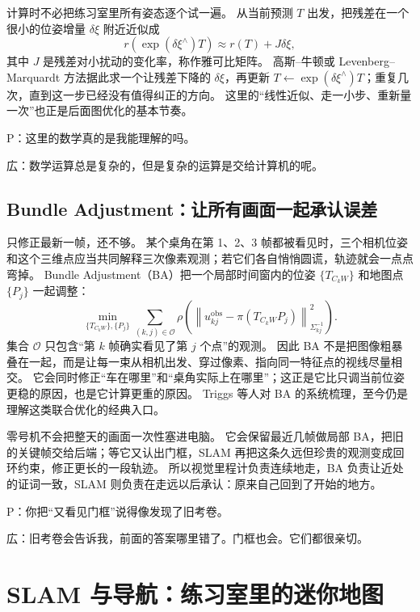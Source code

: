 计算时不必把练习室里所有姿态逐个试一遍。
从当前预测 $T$ 出发，把残差在一个很小的位姿增量 $\delta\xi$ 附近近似成
\begin{equation}
r\!\left(\exp(\delta\xi^\wedge)T\right)
\approx r(T)+J\delta\xi,
\end{equation}
其中 $J$ 是残差对小扰动的变化率，称作雅可比矩阵。
高斯--牛顿或 Levenberg--Marquardt 方法据此求一个让残差下降的 $\delta\xi$，再更新 $T\leftarrow\exp(\delta\xi^\wedge)T$；重复几次，直到这一步已经没有值得纠正的方向。
这里的“线性近似、走一小步、重新量一次”也正是后面图优化的基本节奏。

P：这里的数学真的是我能理解的吗。

広：数学运算总是复杂的，但是复杂的运算是交给计算机的呢。

\subsection{Bundle Adjustment：让所有画面一起承认误差}

只修正最新一帧，还不够。
某个桌角在第 1、2、3 帧都被看见时，三个相机位姿和这个三维点应当共同解释三次像素观测；若它们各自悄悄圆谎，轨迹就会一点点弯掉。
Bundle Adjustment（BA）把一个局部时间窗内的位姿 $\{T_{C_kW}\}$ 和地图点 $\{P_j\}$ 一起调整：
\begin{equation}
\min_{\{T_{C_kW}\},\{P_j\}}
\sum_{(k,j)\in\mathcal O}
\rho\!\left(
\left\|u_{kj}^{\mathrm{obs}}-\pi(T_{C_kW}P_j)\right\|^2_{\Sigma_{kj}^{-1}}
\right).
\label{eq:vo-local-ba}
\end{equation}
集合 $\mathcal O$ 只包含“第 $k$ 帧确实看见了第 $j$ 个点”的观测。
因此 BA 不是把图像粗暴叠在一起，而是让每一束从相机出发、穿过像素、指向同一特征点的视线尽量相交。
它会同时修正“车在哪里”和“桌角实际上在哪里”；这正是它比只调当前位姿更稳的原因，也是它计算更重的原因。
Triggs 等人对 BA 的系统梳理，至今仍是理解这类联合优化的经典入口\cite{triggs2000ba}。

零号机不会把整天的画面一次性塞进电脑。
它会保留最近几帧做局部 BA，把旧的关键帧交给后端；等它又认出门框，SLAM 再把这条久远但珍贵的观测变成回环约束，修正更长的一段轨迹。
所以视觉里程计负责连续地走，BA 负责让近处的证词一致，SLAM 则负责在走远以后承认：原来自己回到了开始的地方。

P：你把“又看见门框”说得像发现了旧考卷。

広：旧考卷会告诉我，前面的答案哪里错了。门框也会。它们都很亲切。

\section{SLAM 与导航：练习室里的迷你地图}


